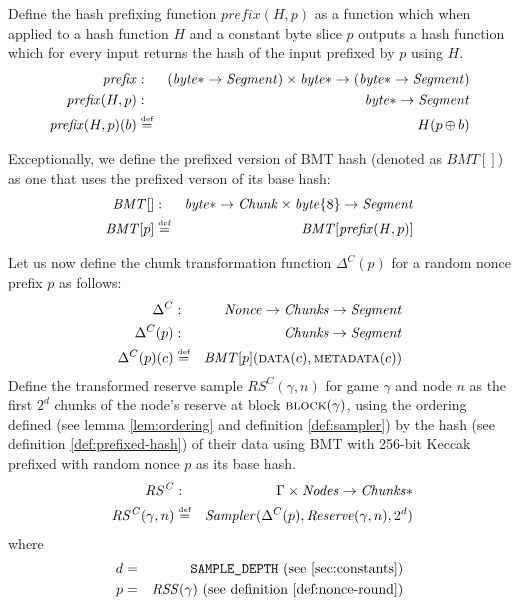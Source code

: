 \begin{definition}
\label{def:prefixed-hash}
Define the hash prefixing function $\mathit{prefix}(H,p)$ as a function which when applied to a hash function $\mathit{H}$ and a constant byte slice $p$  outputs a hash function which for every input returns the hash of the input prefixed by $p$ using $H$.
%
\begin{eqnarray}
\mathit{prefix}&: &(\mathit{byte}{*}\to\mathit{Segment})\times\mathit{byte}{*}\to (\mathit{byte}{*}\to\mathit{Segment})
\\
\mathit{prefix}(H,p) &: &\mathit{byte}{*}\to\mathit{Segment}\\
\mathit{prefix}(H,p)(b) &\overset{\textrm{\tiny def}}{=} & H(p\operatorname{\operatorname{\oplus}} b)
\end{eqnarray}

Exceptionally, we define the prefixed version of BMT hash (denoted as $\mathit{BMT}[]$) as one   that uses the prefixed verson of its base hash:
%   
\begin{eqnarray}
\mathit{BMT}[]&: &\mathit{byte}{*}\to\mathit{Chunk}\times\mathit{byte}\{8\}\to\mathit{Segment}\\
\mathit{BMT}[p]&\overset{\textrm{\tiny def}}{=}&\mathit{BMT}[\mathit{prefix}(\mathit{H},p)]
\end{eqnarray}

\end{definition}
    
\begin{definition}
\label{def:transformed-reserve}
%
Let us now define the chunk transformation function $\Delta^C(p)$
for a random nonce prefix $p$ as follows: 
%
\begin{eqnarray}
\Delta^C&:&\mathit{Nonce}\to\mathit{Chunks}\to\mathit{Segment}\\
\Delta^C(p)&:&\mathit{Chunks}\to\mathit{Segment}\\
\Delta^C(p)(c)&\overset{\textrm{\tiny def}}{=}&\mathit{BMT}[p](\textsc{data}(c),\textsc{metadata}(c))
\end{eqnarray}
%
Define the transformed reserve sample $\mathit{RS^C}(\gamma,n)$ for game $\gamma$ and node $n$ as the first  $2^d$ chunks of the node's reserve at block $\textsc{block}(\gamma)$, using the ordering defined (see lemma \ref{lem:ordering} and definition \ref{def:sampler}) by the hash (see definition \ref{def:prefixed-hash}) of their data  using BMT with 256-bit Keccak prefixed with random nonce $p$ as its base hash.
%
\begin{eqnarray}
\mathit{RS^C}&:&\Gamma\times\mathit{Nodes}\to\mathit{Chunks}{*}\\\
\mathit{RS^C}(\gamma,n)&\overset{\textrm{\tiny def}}{=}&\mathit{Sampler}(\Delta^C(p),\mathit{Reserve}(\gamma,n),2^d)
\end{eqnarray}
where 
\begin{eqnarray}
d & = & \texttt{SAMPLE\_DEPTH} \text{ (see \ref{sec:constants})} \\
p & = & \mathit{RSS}(\gamma) \text{ (see definition \ref{def:nonce-round})}
\end{eqnarray}
\end{definition}


